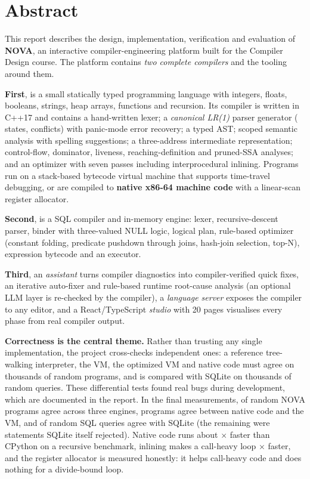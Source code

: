 \chapter*{Abstract}
This report describes the design, implementation, verification and evaluation of \textbf{NOVA}, an interactive compiler-engineering platform built for the Compiler Design course. The platform contains \emph{two complete compilers} and the tooling around them.

\textbf{First}, \nova{} is a small statically typed programming language with integers, floats, booleans, strings, heap arrays, functions and recursion. Its compiler is written in C++17 and contains a hand-written lexer; a \emph{canonical LR(1)} parser generator (\LRStates{} states, \LRConflicts{} conflicts) with panic-mode error recovery; a typed AST; scoped semantic analysis with spelling suggestions; a three-address intermediate representation; control-flow, dominator, liveness, reaching-definition and pruned-SSA analyses; and an optimizer with seven passes including interprocedural inlining. Programs run on a stack-based bytecode virtual machine that supports time-travel debugging, or are compiled to \textbf{native x86-64 machine code} with a linear-scan register allocator.

\textbf{Second}, \novasql{} is a SQL compiler and in-memory engine: lexer, recursive-descent parser, binder with three-valued NULL logic, logical plan, rule-based optimizer (constant folding, predicate pushdown through joins, hash-join selection, top-N), expression bytecode and an executor.

\textbf{Third}, an \emph{assistant} turns compiler diagnostics into compiler-verified quick fixes, an iterative auto-fixer and rule-based runtime root-cause analysis (an optional LLM layer is re-checked by the compiler), a \emph{language server} exposes the compiler to any editor, and a React/TypeScript \emph{studio} with 20 pages visualises every phase from real compiler output.

\textbf{Correctness is the central theme.} Rather than trusting any single implementation, the project cross-checks independent ones: a reference tree-walking interpreter, the VM, the optimized VM and native code must agree on thousands of random programs, and \novasql{} is compared with SQLite on thousands of random queries. These differential tests found real bugs during development, which are documented in the report. In the final measurements, \FuzzPassed{} of \FuzzN{} random NOVA programs agree across three engines, \NativeDiffPass{} programs agree between native code and the VM, and \SQLFuzzPass{} of \SQLFuzzTotal{} random SQL queries agree with SQLite (the remaining \SQLFuzzSkipped{} were statements SQLite itself rejected). Native code runs about \BenchFibVspy$\times$ faster than CPython on a recursive benchmark, inlining makes a call-heavy loop \BenchInlineGain$\times$ faster, and the register allocator is measured honestly: it helps call-heavy code and does nothing for a divide-bound loop.

